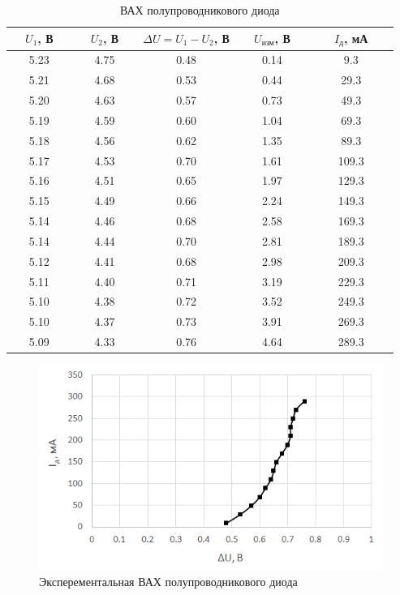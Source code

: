 \begin{table}[H]
	\begin{center}
	\caption{ВАХ полупроводникового диода}
	\def\arraystretch{1.5}
		\begin{tabular}{|c|c|c|c|c|}
		\hline 
		\ \ $U_1$, В\ \  & \ \ $U_2$, В\ \  & $\Delta U = U_1 - U_2$, В & \ \ $U_\text{изм}$, В\ \  & \ \ \ $I_\text{д}$, мА\ \ \ \\ 
		\hline 
		5.23 & 4.75 & 0.48 & 0.14 & 9.3 \\ 
		\hline 
		5.21 & 4.68 & 0.53 & 0.44 & 29.3 \\ 
		\hline 
		5.20 & 4.63 & 0.57 & 0.73 & 49.3 \\ 
		\hline 
		5.19 & 4.59 & 0.60 & 1.04 & 69.3 \\ 
		\hline 
		5.18 & 4.56 & 0.62 & 1.35 & 89.3 \\ 
		\hline 
		5.17 & 4.53 & 0.70 & 1.61 & 109.3 \\ 
		\hline 
		5.16 & 4.51 & 0.65 & 1.97 & 129.3 \\ 
		\hline 
		5.15 & 4.49 & 0.66 & 2.24 & 149.3 \\ 
		\hline 
		5.14 & 4.46 & 0.68 & 2.58 & 169.3 \\ 
		\hline 
		5.14 & 4.44 & 0.70 & 2.81 & 189.3 \\ 
		\hline 
		5.12 & 4.41 & 0.68 & 2.98 & 209.3 \\ 
		\hline 
		5.11 & 4.40 & 0.71 & 3.19 & 229.3 \\ 
		\hline 
		5.10 & 4.38 & 0.72 & 3.52 & 249.3 \\ 
		\hline 
		5.10 & 4.37 & 0.73 & 3.91 & 269.3 \\ 
		\hline 
		5.09 & 4.33 & 0.76 & 4.64 & 289.3 \\ 
		\hline 
		\end{tabular} 
		\label{tab:5:1}
	\end{center}
\end{table}

\begin{figure}[H]
	\begin{center}
		\includegraphics[width=15cm]{img/1}
		\caption{Эксперементальная ВАХ полупроводникового диода}
		\label{g:1} %
	\end{center}
\end{figure}
\newpage
